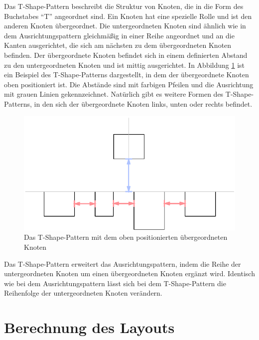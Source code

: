 Das T-Shape-Pattern beschreibt die Struktur von Knoten, die in die Form des Buchstabes \enquote{T} angeordnet sind. Ein Knoten hat eine spezielle Rolle und ist den anderen Knoten übergeordnet. Die untergeordneten Knoten sind ähnlich wie in dem Ausrichtungspattern gleichmäßig in einer Reihe angeordnet und an die Kanten ausgerichtet, die sich am nächsten zu dem übergeordneten Knoten befinden. Der übergeordnete Knoten befindet sich in einem definierten Abstand zu den untergeordneten Knoten und ist mittig ausgerichtet. In Abbildung \ref{fig:layout-pattern-t-shape} ist ein Beispiel des T-Shape-Patterns dargestellt, in dem der übergeordnete Knoten oben positioniert ist. Die Abstände sind mit farbigen Pfeilen und die Ausrichtung mit grauen Linien gekennzeichnet. Natürlich gibt es weitere Formen des T-Shape-Patterns, in den sich der übergeordnete Knoten links, unten oder rechts befindet.

\begin{figure}[hbt]
    \centering
    \includegraphics{resources/layout-pattern-t-shape}
    \caption{Das T-Shape-Pattern mit dem oben positionierten übergeordneten Knoten}
    \label{fig:layout-pattern-t-shape}
\end{figure}

Das T-Shape-Pattern erweitert das Ausrichtungspattern, indem die Reihe der untergeordneten Knoten um einen übergeordneten Knoten ergänzt wird. Identisch wie bei dem Ausrichtungspattern lässt sich bei dem T-Shape-Pattern die Reihenfolge der untergeordneten Knoten verändern.


\section{Berechnung des Layouts}
\label{sec:layout-calculation}

